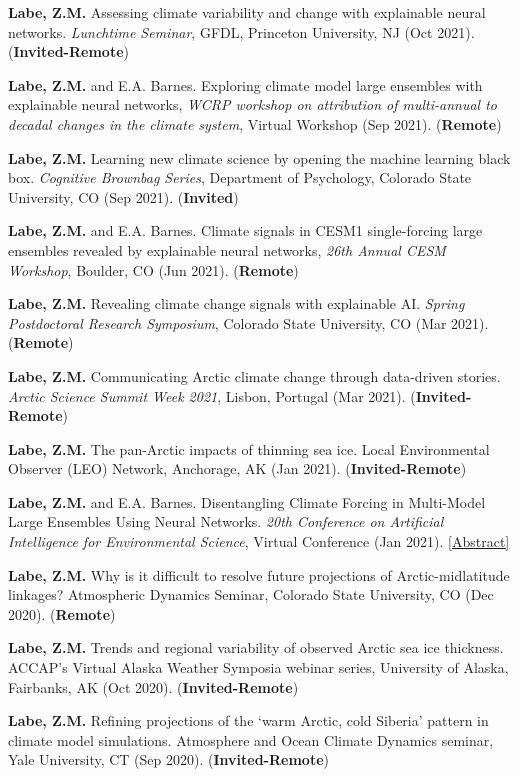 \documentclass[margin,line,palatino,courier,10pt]{res}
\begin{document}
\begin{resume}
\begin{etaremune}[leftmargin=0in,topsep=0in,parsep=0in]
\item \textbf{Labe, Z.M.} Assessing climate variability and change with explainable neural networks. \textit{Lunchtime Seminar}, GFDL, Princeton University, NJ (Oct 2021). (\textbf{Invited-Remote})
\item \textbf{Labe, Z.M.} and E.A. Barnes. Exploring climate model large ensembles with explainable neural networks, \textit{WCRP workshop on attribution of multi-annual to decadal changes in the climate system}, Virtual Workshop (Sep 2021). (\textbf{Remote})
\item \textbf{Labe, Z.M.} Learning new climate science by opening the machine learning black box. \textit{Cognitive Brownbag Series}, Department of Psychology, Colorado State University, CO (Sep 2021). (\textbf{Invited})
\item \textbf{Labe, Z.M.} and E.A. Barnes. Climate signals in CESM1 single-forcing large ensembles revealed by explainable neural networks, \textit{26th Annual CESM Workshop}, Boulder, CO (Jun 2021). (\textbf{Remote})
\item \textbf{Labe, Z.M.} Revealing climate change signals with explainable AI. \textit{Spring Postdoctoral Research Symposium}, Colorado State University, CO (Mar 2021). (\textbf{Remote})
\item \textbf{Labe, Z.M.} Communicating Arctic climate change through data-driven stories. \textit{Arctic Science Summit Week 2021}, Lisbon, Portugal (Mar 2021). (\textbf{Invited-Remote})
\item \textbf{Labe, Z.M.} The pan-Arctic impacts of thinning sea ice. Local Environmental Observer (LEO) Network, Anchorage, AK (Jan 2021). (\textbf{Invited-Remote})
\item \textbf{Labe, Z.M.} and E.A. Barnes. Disentangling Climate Forcing in Multi-Model Large Ensembles Using Neural Networks. \textit{20th Conference on Artificial Intelligence for Environmental Science}, Virtual Conference (Jan 2021). \href{https://ams.confex.com/ams/101ANNUAL/meetingapp.cgi/Paper/379553}{[Abstract]}
\item \textbf{Labe, Z.M.} Why is it difficult to resolve future projections of Arctic-midlatitude linkages? Atmospheric Dynamics Seminar, Colorado State University, CO (Dec 2020). (\textbf{Remote})
\item \textbf{Labe, Z.M.} Trends and regional variability of observed Arctic sea ice thickness. ACCAP’s Virtual Alaska Weather Symposia webinar series, University of Alaska, Fairbanks, AK (Oct 2020). (\textbf{Invited-Remote})
\item \textbf{Labe, Z.M.} Refining projections of the `warm Arctic, cold Siberia' pattern in climate model simulations. Atmosphere and Ocean Climate Dynamics seminar, Yale University, CT (Sep 2020). (\textbf{Invited-Remote})

\end{etaremune}
\end{resume}
\end{document}
